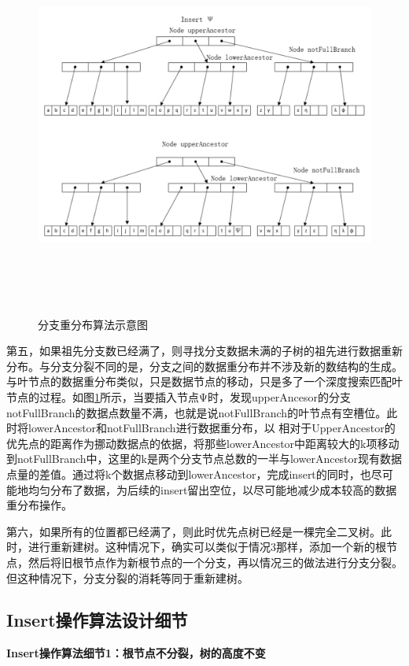 \begin{figure}[H]
  \centering
  \includegraphics[width=6in,height=5in]{new_FIGs/chapter4/insert-show4.pdf}
  \caption{分支重分布算法示意图}\label{insert-show4}
\end{figure}
第五，如果祖先分支数已经满了，则寻找分支数据未满的子树的祖先进行数据重新分布。与分支分裂不同的是，分支之间的数据重分布并不涉及新的数结构的生成。与叶节点的数据重分布类似，只是数据节点的移动，只是多了一个深度搜索匹配叶节点的过程。如图\ref{insert-show4}所示，当要插入节点Ψ时，发现upperAncesor的分支notFullBranch的数据点数量不满，也就是说notFullBranch的叶节点有空槽位。此时将lowerAncestor和notFullBranch进行数据重分布，以
相对于UpperAncestor的优先点的距离作为挪动数据点的依据，将那些lowerAncestor中距离较大的k项移动到notFullBranch中，这里的k是两个分支节点总数的一半与lowerAncestor现有数据点量的差值。通过将k个数据点移动到lowerAncestor，完成insert的同时，也尽可能地均匀分布了数据，为后续的insert留出空位，以尽可能地减少成本较高的数据重分布操作。


第六，如果所有的位置都已经满了，则此时优先点树已经是一棵完全二叉树。此时，进行重新建树。这种情况下，确实可以类似于情况3那样，添加一个新的根节点，然后将旧根节点作为新根节点的一个分支，再以情况三的做法进行分支分裂。但这种情况下，分支分裂的消耗等同于重新建树。

\subsection{Insert操作算法设计细节}
\textbf{Insert操作算法细节1：根节点不分裂，树的高度不变}

